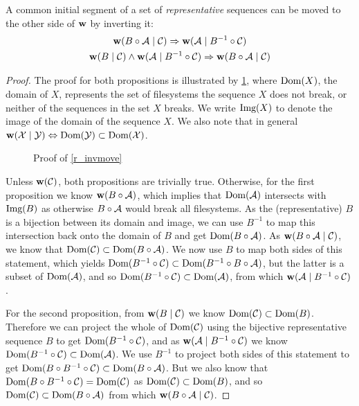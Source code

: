 \begin{mylem}\label{r_invmove}
A common initial segment of a set of \emph{representative} sequences can be moved to the other side of $\mathbf{w}$ by inverting it:
\begin{gather*}
\mathbf{w}({B\circ \mathcal{A}}\mathrel{|}{\mathcal{C}}) \Rightarrow \mathbf{w}({\mathcal{A}}\mathrel{|}{B^{-1}\circ \mathcal{C}}) \\
\mathbf{w}({B}\mathrel{|}{\mathcal{C}}) \wedge \mathbf{w}({\mathcal{A}}\mathrel{|}{B^{-1}\circ \mathcal{C}}) \Rightarrow \mathbf{w}({B\circ \mathcal{A}}\mathrel{|}{\mathcal{C}})
\end{gather*}
\end{mylem}
\begin{proof}

The proof for both propositions is illustrated by \cref{fig_invmove}, where
$\textrm{Dom}({X})$, the domain of $X$, represents the set of filesystems
the sequence $X$ does not break, or neither of the sequences in the set $X$ breaks.
We write $\textrm{Img}({X})$ to denote the image of the domain of the sequence $X$.
We also note that in general $\mathbf{w}({\mathcal{X}}\mathrel{|}{\mathcal{Y}}) \Leftrightarrow \textrm{Dom}({\mathcal{Y}}) \subset \textrm{Dom}({\mathcal{X}})$.

\begin{figure}[htb]

\caption{Proof of \cref{r_invmove}}\label{fig_invmove}
\end{figure}

Unless $\mathbf{w}({\mathcal{C}})$, both propositions are trivially true. Otherwise,
for the first proposition
we know $\mathbf{w}({B\circ\mathcal{A}})$, which implies that $\textrm{Dom}({\mathcal{A}})$ intersects with $\textrm{Img}({B})$ 
as otherwise $B\circ\mathcal{A}$ would break all filesystems.
As the (representative) $B$ is a bijection between its domain and image,
we can use $B^{-1}$ to map this intersection back
onto the domain of $B$ and get $\textrm{Dom}({B\circ\mathcal{A}})$.
As $\mathbf{w}({B\circ \mathcal{A}}\mathrel{|}{\mathcal{C}})$, 
we know that $\textrm{Dom}({\mathcal{C}}) \subset \textrm{Dom}({B\circ\mathcal{A}})$.
We now use $B$ to map both sides of this statement, which yields
$\textrm{Dom}({B^{-1}\circ \mathcal{C}}) \subset \textrm{Dom}({B^{-1}\circ B\circ\mathcal{A}})$,
but the latter is a subset of $\textrm{Dom}({\mathcal{A}})$,
and so $\textrm{Dom}({B^{-1}\circ \mathcal{C}}) \subset \textrm{Dom}({\mathcal{A}})$,
from which $\mathbf{w}({\mathcal{A}}\mathrel{|}{B^{-1}\circ \mathcal{C}})$.

For the second proposition, 
from $\mathbf{w}({B}\mathrel{|}{\mathcal{C}})$ we know $\textrm{Dom}({\mathcal{C}}) \subset \textrm{Dom}({B})$.
Therefore we can project the whole of $\textrm{Dom}({\mathcal{C}})$ using the bijective representative sequence $B$
to get $\textrm{Dom}({B^{-1}\circ\mathcal{C}})$, and as $\mathbf{w}({\mathcal{A}}\mathrel{|}{B^{-1}\circ \mathcal{C}})$
we know
$\textrm{Dom}({B^{-1}\circ\mathcal{C}}) \subset \textrm{Dom}({\mathcal{A}})$.
We use $B^{-1}$ to project both sides of this statement to get
$\textrm{Dom}({B\circ B^{-1}\circ\mathcal{C}}) \subset \textrm{Dom}({B\circ\mathcal{A}})$.
But we also know that $\textrm{Dom}({B\circ B^{-1}\circ\mathcal{C}}) = \textrm{Dom}({\mathcal{C}})$
as $\textrm{Dom}({\mathcal{C}}) \subset \textrm{Dom}({B})$,
and so $\textrm{Dom}({\mathcal{C}}) \subset \textrm{Dom}({B\circ\mathcal{A}})$
from which $\mathbf{w}({B\circ \mathcal{A}}\mathrel{|}{\mathcal{C}})$.
\end{proof}



